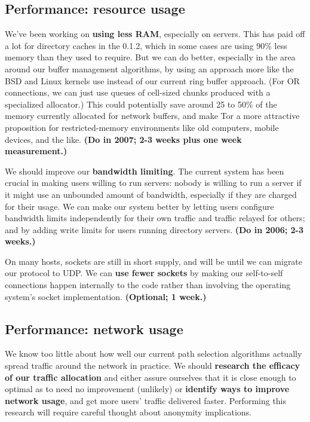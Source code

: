 \documentclass{article}
\newcommand{\plan}[1]{ {\bf (#1)}}
\begin{document}
\subsection{Performance: resource usage}
We've been working on {\bf using less RAM}, especially on servers.  This has
paid off a lot for directory caches in the 0.1.2, which in some cases are
using 90\% less memory than they used to require.  But we can do better,
especially in the area around our buffer management algorithms, by using an
approach more like the BSD and Linux kernels use instead of our current ring
buffer approach.  (For OR connections, we can just use queues of cell-sized
chunks produced with a specialized allocator.)  This could potentially save
around 25 to 50\% of the memory currently allocated for network buffers, and
make Tor a more attractive proposition for restricted-memory environments
like old computers, mobile devices, and the like.\plan{Do in 2007; 2-3 weeks
  plus one week measurement.}

We should improve our {\bf bandwidth limiting}.  The current system has been
crucial in making users willing to run servers: nobody is willing to run a
server if it might use an unbounded amount of bandwidth, especially if they
are charged for their usage.  We can make our system better by letting users
configure bandwidth limits independently for their own traffic and traffic
relayed for others; and by adding write limits for users running directory
servers.\plan{Do in 2006; 2-3 weeks.}

On many hosts, sockets are still in short supply, and will be until we can
migrate our protocol to UDP.  We can {\bf use fewer sockets} by making our
self-to-self connections happen internally to the code rather than involving
the operating system's socket implementation.\plan{Optional; 1 week.}

\subsection{Performance: network usage}
We know too little about how well our current path
selection algorithms actually spread traffic around the network in practice.
We should {\bf research the efficacy of our traffic allocation} and either
assure ourselves that it is close enough to optimal as to need no improvement
(unlikely) or {\bf identify ways to improve network usage}, and get more
users' traffic delivered faster.  Performing this research will require
careful thought about anonymity implications.
\end{document}
